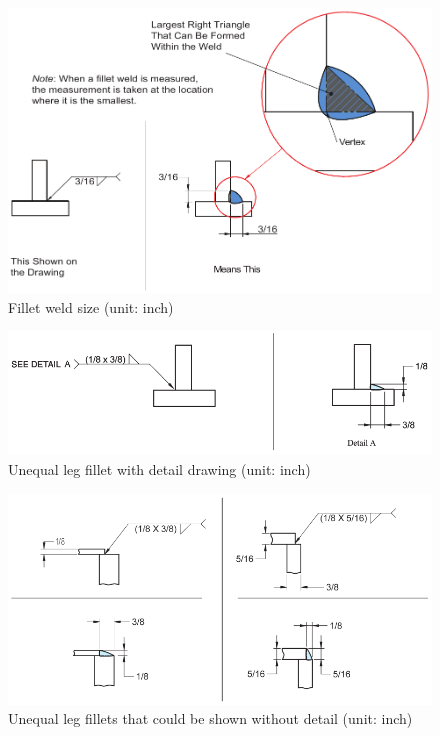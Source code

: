 \begin{figure}[H]
\centering
\includegraphics[width=.99\textwidth]{PIC/CH07/EXAMPLE/FWS}
\caption{Fillet weld size (unit: inch) \citep{Corgan2017}}
\end{figure}
\begin{figure}[H]
\centering
\includegraphics{PIC/CH07/EXAMPLE/UL}
\caption{Unequal leg fillet with detail drawing (unit: inch) \citep{Corgan2017}}
\end{figure}
\begin{figure}[H]
\centering
\includegraphics{PIC/CH07/EXAMPLE/UL2}
\caption{Unequal leg fillets that could be shown without detail (unit: inch) \citep{Corgan2017}}
\end{figure}
